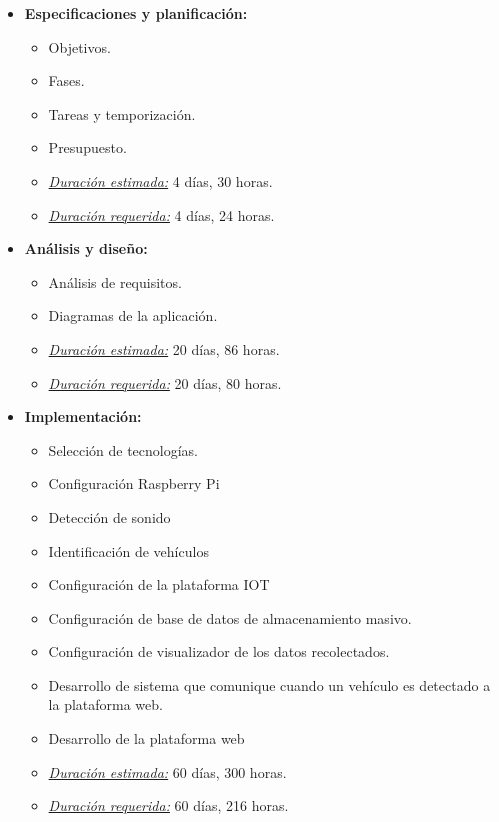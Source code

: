 \begin{itemize}
   \item \textbf{Especificaciones y planificación:}
   \begin{itemize}
    \item Objetivos.
    \item Fases.
    \item Tareas y temporización.
    \item Presupuesto.
    \item \underline{\textit{Duración estimada:}} 4 días, 30 horas.
    \item \underline{\textit{Duración requerida:}} 4 días, 24 horas.
   \end{itemize}
\end{itemize}

\begin{itemize}
   \item \textbf{Análisis y diseño:}
   \begin{itemize}
    \item Análisis de requisitos.
    \item Diagramas de la aplicación.
    \item \underline{\textit{Duración estimada:}} 20 días, 86 horas.
    \item \underline{\textit{Duración requerida:}} 20 días, 80 horas.
   \end{itemize}
\end{itemize}

\begin{itemize}
 \item \textbf{Implementación:}
 \begin{itemize}
  \item Selección de tecnologías.
  \item Configuración Raspberry Pi
  \item Detección de sonido
  \item Identificación de vehículos
  \item Configuración de la plataforma IOT
  \item Configuración de base de datos de almacenamiento masivo.
  \item Configuración de visualizador de los datos recolectados.
  \item Desarrollo de sistema que comunique cuando un vehículo es detectado a la plataforma web.
  \item Desarrollo de la plataforma web
  \item \underline{\textit{Duración estimada:}} 60 días, 300 horas.
  \item \underline{\textit{Duración requerida:}} 60 días, 216 horas.
 \end{itemize}
\end{itemize}

